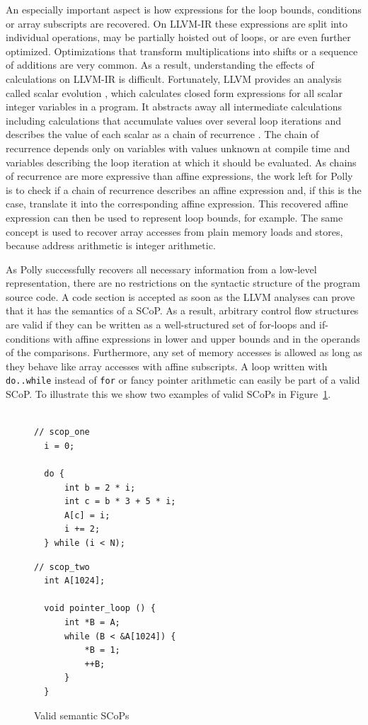 \documentclass{acm_proc_article-sp}
\begin{document}
An especially important aspect is how expressions for the loop bounds,
conditions or array subscripts are recovered. On LLVM-IR these expressions are
split into individual operations, may be partially hoisted out of loops, or are
even further optimized. Optimizations that transform multiplications into
shifts or a sequence of additions are very common. As a result, understanding
the effects of calculations on LLVM-IR is difficult.  Fortunately, LLVM
provides an analysis called scalar evolution \cite{Engelen01}, which calculates
closed form expressions for all scalar integer variables in a program.  It
abstracts away all intermediate calculations including calculations that
accumulate values over several loop iterations and describes the value of each
scalar as a chain of recurrence \cite{Bachmann:1994}. The chain of recurrence
depends only on variables with values unknown at compile time and variables
describing the loop iteration at which it should be evaluated. As chains of
recurrence are more expressive than affine expressions, the work left for Polly
is to check if a chain of recurrence describes an affine expression and, if
this is the case, translate it into the corresponding affine expression. This
recovered affine expression can then be used to represent loop bounds, for
example.  The same concept is used to recover array accesses from plain memory
loads and stores, because address arithmetic is integer arithmetic.

As Polly successfully recovers all necessary information from a low-level
representation, there are no restrictions on the syntactic structure of the
program source code. A code section is accepted as soon as the LLVM analyses
can prove that it has the semantics of a SCoP. As a result, 
arbitrary control
flow structures are valid if they can be written as a well-structured set
of for-loops and if-conditions with affine expressions in lower and upper
bounds and in the operands of the comparisons. Furthermore, any set of
memory accesses is allowed as long as they behave like array accesses with affine subscripts.
A loop written
with \texttt{do..while} instead of \texttt{for} or fancy pointer arithmetic can easily be part of a valid SCoP.
To illustrate this we show two examples of valid SCoPs in Figure~\ref{semscop}.

\begin{figure}
\begin{verbatim}

// scop_one
  i = 0;
  
  do {
      int b = 2 * i;
      int c = b * 3 + 5 * i;
      A[c] = i;
      i += 2;
  } while (i < N);
\end{verbatim}

\begin{verbatim}
// scop_two
  int A[1024];
  
  void pointer_loop () {
      int *B = A;
      while (B < &A[1024]) {
          *B = 1;
          ++B;
      }
  }
\end{verbatim}
\caption{Valid semantic SCoPs}
\label{semscop}
\end{figure}
\end{document}
